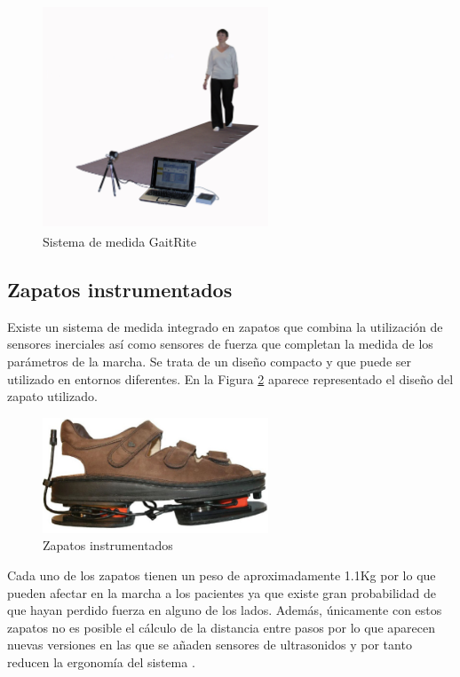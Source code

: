 	\begin{figure}[H]
		\centering
		\includegraphics[width=0.6\textwidth]{./graphics/GaitRite}
		\caption{Sistema de medida GaitRite\textsuperscript{\textregistered}} \label{fig:gaitrite}
	\end{figure}
	
	\subsection{Zapatos instrumentados}
	
	\cite{shoes} Existe un sistema de medida integrado en zapatos que combina la utilización de sensores inerciales así como sensores de fuerza que completan la medida de los parámetros de la marcha. Se trata de un diseño compacto y que puede ser utilizado en entornos diferentes. En la Figura \ref{fig:shoes} aparece representado el diseño del zapato utilizado.
	
		\begin{figure}[H]
			\centering
			\includegraphics[width=0.6\textwidth]{./graphics/shoes}
			\caption{Zapatos instrumentados} \label{fig:shoes}
		\end{figure}
		 

Cada uno de los zapatos tienen un peso de aproximadamente 1.1Kg por lo que pueden afectar en la marcha a los pacientes ya que existe gran probabilidad de que hayan perdido fuerza en alguno de los lados. Además, únicamente con estos zapatos no es posible el cálculo de la distancia entre pasos por lo que aparecen nuevas versiones en las que se añaden sensores de ultrasonidos y por tanto reducen la ergonomía del sistema  \cite{shoes} . 


	
	
	